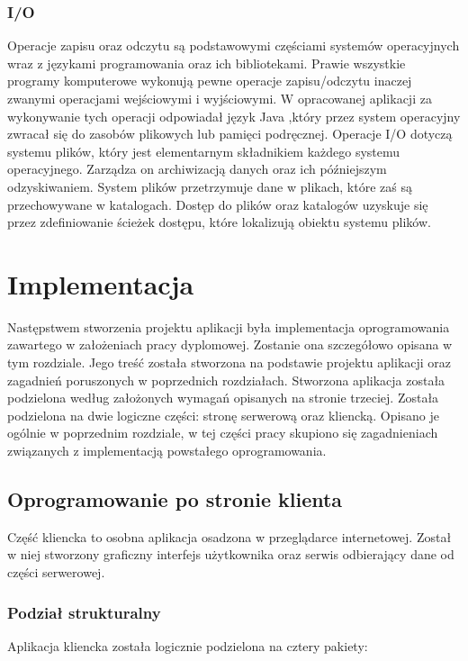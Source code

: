 \documentclass[12pt, twoside]{report}
\begin{document}
\subsection{I/O}
Operacje zapisu oraz odczytu są podstawowymi częściami systemów operacyjnych wraz z językami programowania oraz ich bibliotekami. Prawie wszystkie programy komputerowe wykonują pewne operacje zapisu/odczytu inaczej zwanymi operacjami wejściowymi i wyjściowymi. W opracowanej aplikacji za wykonywanie tych operacji odpowiadał język Java ,który przez system operacyjny zwracał się do zasobów plikowych lub pamięci podręcznej. Operacje I/O dotyczą systemu plików, który jest elementarnym składnikiem każdego systemu operacyjnego. Zarządza on archiwizacją danych oraz ich późniejszym odzyskiwaniem. System plików przetrzymuje dane w plikach, które zaś są przechowywane w katalogach. Dostęp do plików oraz katalogów uzyskuje się przez zdefiniowanie ścieżek dostępu, które lokalizują obiektu systemu plików.\cite{i/o}

\newpage
\chapter{Implementacja}
Następstwem stworzenia projektu aplikacji była implementacja oprogramowania zawartego w założeniach pracy dyplomowej. Zostanie ona szczegółowo opisana w tym rozdziale. Jego treść została stworzona na podstawie projektu aplikacji oraz zagadnień poruszonych w poprzednich rozdziałach. Stworzona aplikacja została podzielona według założonych wymagań opisanych na stronie trzeciej. Została podzielona na dwie logiczne części: stronę serwerową oraz kliencką. Opisano je ogólnie w poprzednim rozdziale, w tej części pracy skupiono się zagadnieniach związanych z implementacją powstałego oprogramowania.

\section{Oprogramowanie po stronie klienta}
Część kliencka to osobna aplikacja osadzona w przeglądarce internetowej. Został w niej stworzony graficzny interfejs użytkownika oraz serwis odbierający dane od części serwerowej.
\subsection{Podział strukturalny}
Aplikacja kliencka została logicznie podzielona na cztery pakiety: 
\end{document}
